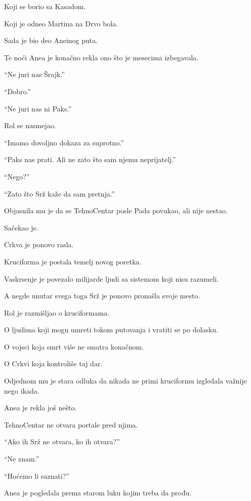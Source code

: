 Koji se borio sa Kasadom.

Koji je odneo Martina na Drvo bola.

Sada je bio deo Aneinog puta.

\bigskip

Te noći Anea je konačno rekla ono što je mesecima izbegavala.

``Ne juri nas Šrajk.''

``Dobro.''

``Ne juri nas ni Paks.''

Rol se nasmejao.

``Imamo dovoljno dokaza za suprotno.''

``Paks nas prati. Ali ne zato što sam njemu neprijatelj.''

``Nego?''

``Zato što Srž kaže da sam pretnja.''

\bigskip

Objasnila mu je da se TehnoCentar posle Pada povukao, ali nije nestao.

Sačekao je.

Crkva je ponovo rasla.

Kruciforma je postala temelj novog poretka.

Vaskrsenje je povezalo milijarde ljudi sa sistemom koji nisu razumeli.

A negde unutar svega toga Srž je ponovo pronašla svoje mesto.

\bigskip

Rol je razmišljao o kruciformama.

O ljudima koji mogu umreti tokom putovanja i vratiti se po dolasku.

O vojsci koja smrt više ne smatra konačnom.

O Crkvi koja kontroliše taj dar.

\bigskip

Odjednom mu je stara odluka da nikada ne primi kruciformu izgledala važnije nego ikada.

\bigskip

Anea je rekla još nešto.

TehnoCentar ne otvara portale pred njima.

\bigskip

``Ako ih Srž ne otvara, ko ih otvara?''

``Ne znam.''

``Hoćemo li saznati?''

Anea je pogledala prema starom luku kojim treba da prođu.

